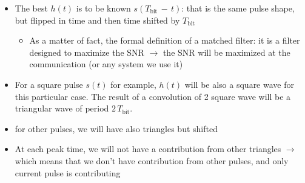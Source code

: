 \begin{itemize}

\item The best $h(t)$ is to be known $s(T_{\text{bit}} \, - \, t)$: that is the same pulse shape, but flipped in time and then time shifted by $T_{\text{bit}}$

\begin{itemize}
    \item As a matter of fact, the formal definition of a matched filter: it is a filter designed to maximize the SNR $\rightarrow$ the SNR will be maximized at the communication (or any system we use it)

\end{itemize}

\item  For a square pulse $s(t)$ for example, $h(t)$ will be also a square wave for this particular case. The result of a convolution of 2 square wave will be a triangular wave of period $2 \, T_{\text{bit}}$.

\item  for other pulses, we will have also triangles but shifted

\item  At each peak time, we will not have a contribution from other triangles $\rightarrow$ which means that we don't have contribution from other pulses, and only current pulse is contributing


\end{itemize}







